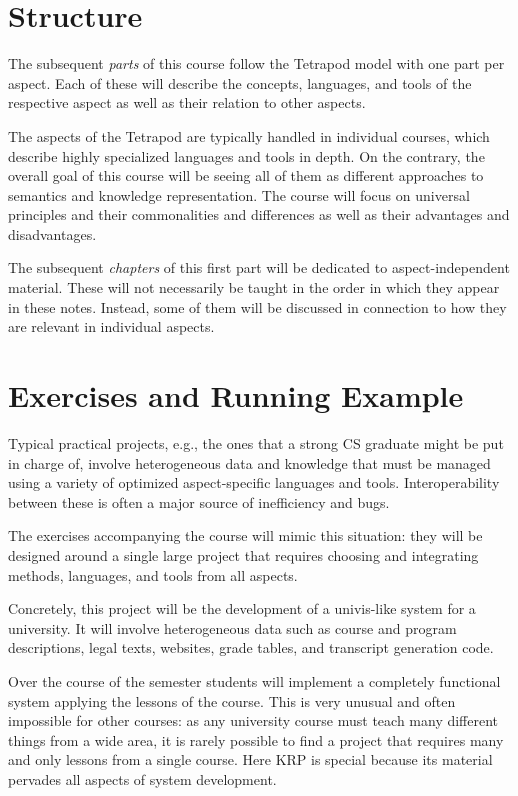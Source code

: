 \section{Structure}

The subsequent \emph{parts} of this course follow the Tetrapod model with one part per aspect.
Each of these will describe the concepts, languages, and tools of the respective aspect as well as their relation to other aspects.

The aspects of the Tetrapod are typically handled in individual courses, which describe highly specialized languages and tools in depth.
On the contrary, the overall goal of this course will be seeing all of them as different approaches to semantics and knowledge representation.
The course will focus on universal principles and their commonalities and differences as well as their advantages and disadvantages.

The subsequent \emph{chapters} of this first part will be dedicated to aspect-independent material.
These will not necessarily be taught in the order in which they appear in these notes.
Instead, some of them will be discussed in connection to how they are relevant in individual aspects.

\section{Exercises and Running Example}

Typical practical projects, e.g., the ones that a strong CS graduate might be put in charge of, involve heterogeneous data and knowledge that must be managed using a variety of optimized aspect-specific languages and tools.
Interoperability between these is often a major source of inefficiency and bugs.

The exercises accompanying the course will mimic this situation: they will be designed around a single large project that requires choosing and integrating methods, languages, and tools from all aspects.

Concretely, this project will be the development of a univis-like system for a university.
It will involve heterogeneous data such as course and program descriptions, legal texts, websites, grade tables, and transcript generation code.

Over the course of the semester students will implement a completely functional system applying the lessons of the course.
This is very unusual and often impossible for other courses: as any university course must teach many different things from a wide area, it is rarely possible to find a project that requires many and only lessons from a single course.
Here KRP is special because its material pervades all aspects of system development.

